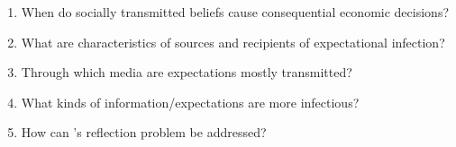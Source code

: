 \begin{enumerate}
	\item When do socially transmitted beliefs cause consequential economic decisions?
    \item What are characteristics of sources and recipients of expectational infection?
    \item Through which media are expectations mostly transmitted?
    \item What kinds of information/expectations are more infectious?
    \item How can \cite{manski1993identification}'s reflection problem be addressed?
    \end{enumerate}
